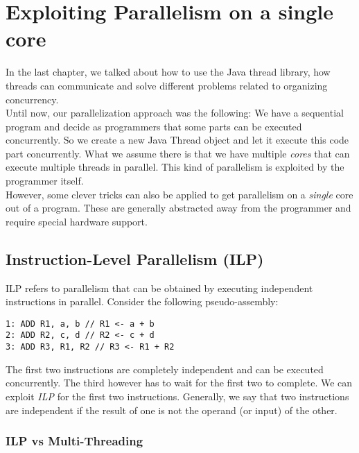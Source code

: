 \documentclass[main.tex]{subfiles}
\begin{document}
\addtolength{\tabcolsep}{-2pt}

\section{Exploiting Parallelism on a single core}
In the last chapter, we talked about how to use the Java thread library, how threads can communicate and solve different problems related to organizing concurrency.\\
Until now, our parallelization approach was the following: We have a sequential program and decide as programmers that some parts can be executed concurrently. So we create a new Java Thread object and let it execute this code part concurrently. What we assume there is that we have multiple \textit{cores} that can execute multiple threads in parallel. This kind of parallelism is exploited by the programmer itself.\\
However, some clever tricks can also be applied to get parallelism on a \textit{single} core out of a program. These are generally abstracted away from the programmer and require special hardware support.

\subsection{Instruction-Level Parallelism (ILP)}
ILP refers to parallelism that can be obtained by executing independent instructions in parallel. Consider the following pseudo-assembly:
\begin{verbatim}
1: ADD R1, a, b // R1 <- a + b
2: ADD R2, c, d // R2 <- c + d
3: ADD R3, R1, R2 // R3 <- R1 + R2
\end{verbatim}
The first two instructions are completely independent and can be executed concurrently. The third however has to wait for the first two to complete. We can exploit \textit{ILP} for the first two instructions. Generally, we say that two instructions are independent if the result of one is not the operand (or input) of the other.

\subsubsection{ILP vs Multi-Threading}
\end{document}
